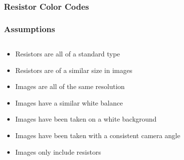 \documentclass{beamer}
\begin{document}

\begin{frame}
\frametitle{Resistor Color Codes}
\begin{center}
\end{center}
\end{frame}


\begin{frame}
\frametitle{Assumptions}
\begin{columns}[c]
  \column{3in}
    \begin{block}{}
	\begin{itemize}
	\item Resistors are all of a standard type
	\item Resistors are of a similar size in images
	\item Images are all of the same resolution
	\item Images have a similar white balance
	\item Images have been taken on a white background
	\item Images have been taken with a consistent camera angle
	\item Images only include resistors
	\end{itemize}
	\end{block}
  \column{1in}
\end{columns}
\end{frame}
\end{document}

